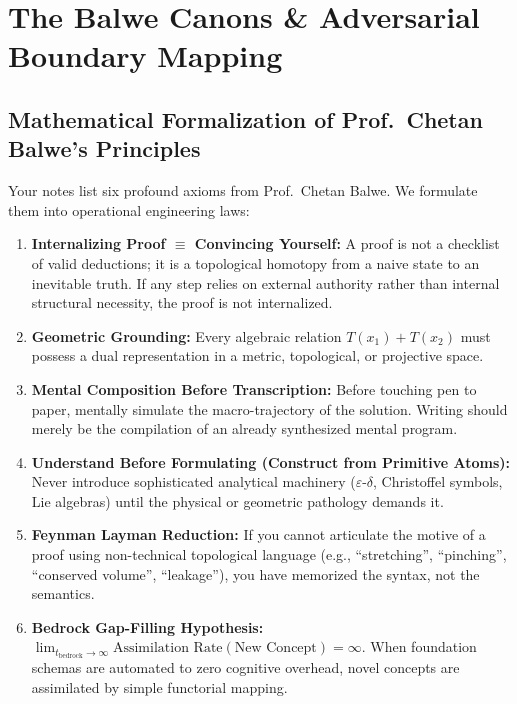 \documentclass[11pt,a4paper]{article}
\begin{document}
\section{The Balwe Canons \& Adversarial Boundary Mapping}

\subsection{Mathematical Formalization of Prof.~Chetan Balwe's Principles}
Your notes list six profound axioms from Prof.~Chetan Balwe. We formulate them into operational engineering laws:

\begin{enumerate}[label=\textbf{\Roman*.}]
    \item \textbf{Internalizing Proof $\equiv$ Convincing Yourself:}
    A proof is not a checklist of valid deductions; it is a topological homotopy from a naive state to an inevitable truth. If any step relies on external authority rather than internal structural necessity, the proof is not internalized.
    
    \item \textbf{Geometric Grounding:}
    Every algebraic relation $T(x_1) + T(x_2)$ must possess a dual representation in a metric, topological, or projective space.
    
    \item \textbf{Mental Composition Before Transcription:}
    Before touching pen to paper, mentally simulate the macro-trajectory of the solution. Writing should merely be the compilation of an already synthesized mental program.
    
    \item \textbf{Understand Before Formulating (Construct from Primitive Atoms):}
    Never introduce sophisticated analytical machinery ($\varepsilon$-$\delta$, Christoffel symbols, Lie algebras) until the physical or geometric pathology demands it.
    
    \item \textbf{Feynman Layman Reduction:}
    If you cannot articulate the motive of a proof using non-technical topological language (e.g., ``stretching'', ``pinching'', ``conserved volume'', ``leakage''), you have memorized the syntax, not the semantics.
    
    \item \textbf{Bedrock Gap-Filling Hypothesis:}
    $\lim_{t_{\text{bedrock}} \to \infty} \text{Assimilation Rate}(\text{New Concept}) = \infty$. When foundation schemas are automated to zero cognitive overhead, novel concepts are assimilated by simple functorial mapping.
\end{enumerate}
\end{document}
